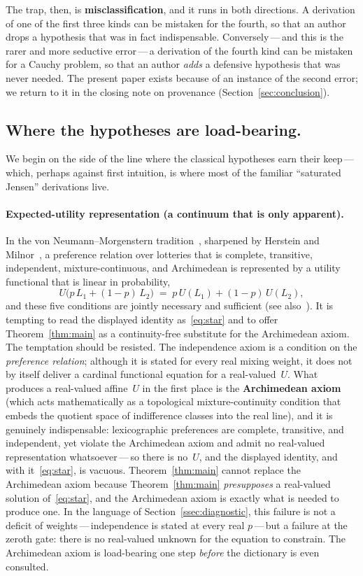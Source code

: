\documentclass{article}
\theoremstyle{plain}
\theoremstyle{definition}
\begin{document}
The trap, then, is \textbf{misclassification}, and it runs in both
directions. A derivation of one of the first three kinds can be
mistaken for the fourth, so that an author drops a hypothesis that was
in fact indispensable. Conversely\,---\,and this is the rarer and more
seductive error\,---\,a derivation of the fourth kind can be mistaken
for a Cauchy problem, so that an author \emph{adds} a defensive
hypothesis that was never needed. The present paper exists because of
an instance of the second error; we return to it in the closing note
on provenance (Section~\ref{sec:conclusion}).

\subsection{Where the hypotheses are load-bearing.}
\label{ssec:load-bearing}

We begin on the side of the line where the classical hypotheses earn
their keep\,---\,which, perhaps against first intuition, is where most
of the familiar ``saturated Jensen'' derivations live.

\paragraph{Expected-utility representation (a continuum that is only apparent).}
In the von Neumann--Morgenstern tradition~\cite{vNM1944}, sharpened by
Herstein and Milnor~\cite{HersteinMilnor1953}, a preference relation
over lotteries that is complete, transitive, independent,
mixture-continuous, and Archimedean is represented by a utility
functional that is linear in probability,
\[
U\bigl(p\,L_1+(1-p)\,L_2\bigr)\;=\;p\,U(L_1)+(1-p)\,U(L_2),
\]
and these five conditions are jointly necessary and sufficient (see
also~\cite{Fishburn1970, Kreps1988}). It is tempting to read the
displayed identity as~\eqref{eq:star} and to offer
Theorem~\ref{thm:main} as a continuity-free substitute for the
Archimedean axiom. The temptation should be resisted. The
independence axiom is a condition on the \emph{preference relation};
although it is stated for every real mixing weight, it does not by
itself deliver a cardinal functional equation for a real-valued~$U$.
What produces a real-valued affine~$U$ in the first place is the
\textbf{Archimedean axiom} (which acts mathematically as a topological mixture-continuity condition that embeds the quotient space of indifference classes into the real line), and it is genuinely indispensable:
lexicographic preferences are complete, transitive, and independent,
yet violate the Archimedean axiom and admit no real-valued
representation whatsoever\,---\,so there is no~$U$, and the displayed
identity, and with it~\eqref{eq:star}, is vacuous.
Theorem~\ref{thm:main} cannot replace the Archimedean axiom because
Theorem~\ref{thm:main} \emph{presupposes} a real-valued solution
of~\eqref{eq:star}, and the Archimedean axiom is exactly what is
needed to produce one. In the language of
Section~\ref{ssec:diagnostic}, this failure is not a deficit of
weights\,---\,independence is stated at every real $p$\,---\,but a
failure at the zeroth gate: there is no real-valued unknown for the
equation to constrain. The Archimedean axiom is load-bearing one step
\emph{before} the dictionary is even consulted.
\end{document}
